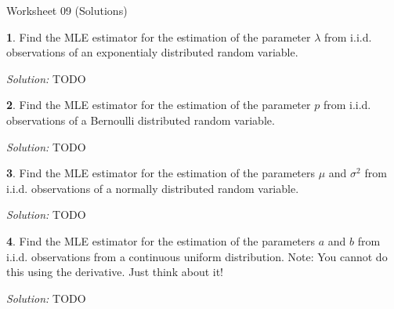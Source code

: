 \documentclass{tufte-handout}
\begin{document}
\justify

{\LARGE Worksheet 09 (Solutions)}

\vspace*{18pt}


\textbf{1}. Find the MLE estimator for the estimation of the parameter $\lambda$ from
i.i.d. observations of an exponentialy distributed random variable.

\textit{Solution:} TODO

\textbf{2}. Find the MLE estimator for the estimation of the parameter $p$ from
i.i.d. observations of a Bernoulli distributed random variable.

\textit{Solution:} TODO

\textbf{3}. Find the MLE estimator for the estimation of the parameters $\mu$ and $\sigma^2$
from i.i.d. observations of a normally distributed random variable.

\textit{Solution:} TODO

\textbf{4}. Find the MLE estimator for the estimation of the parameters $a$ and $b$
from i.i.d. observations from a continuous uniform distribution. Note:
You cannot do this using the derivative. Just think about it!

\textit{Solution:} TODO
\end{document}
